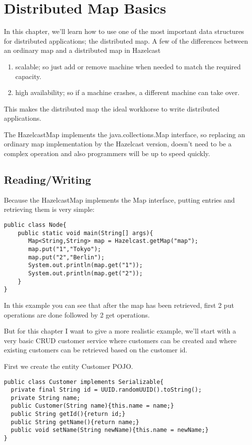 \chapter{Distributed Map Basics}

In this chapter, we'll learn how to use one of the most important data structures for distributed applications; the distributed map. A few of the differences between an ordinary map and a distributed map in Hazelcast
\begin{enumerate}
\item scalable; so just add or remove machine when needed to match the required capacity.
\item high availability; so if a machine crashes, a different machine can take over. 
\end{enumerate}
This makes the distributed map the ideal workhorse to write distributed applications.

The HazelcastMap implements the java.collections.Map interface, so replacing an ordinary map implementation by the Hazelcast version, doesn't need to be a complex operation and also programmers will be up to speed quickly.

\section{Reading/Writing}
Because the HazelcastMap implements the Map interface, putting entries and retrieving them is very simple:

\begin{verbatim}
public class Node{
    public static void main(String[] args){
       Map<String,String> map = Hazelcast.getMap("map");
       map.put("1","Tokyo");
       map.put("2","Berlin");
       System.out.println(map.get("1"));
       System.out.println(map.get("2"));
    }
}
\end{verbatim}
In this example you can see that after the map has been retrieved, first 2 put operations are done followed by 2 get operations. 

But for this chapter I want to give a more realistic example, we'll start with a  very basic CRUD customer service where customers can be created and where existing customers can be retrieved based on the customer id.

First we create the entity Customer POJO. 
\begin{verbatim}
public class Customer implements Serializable{
  private final String id = UUID.randomUUID().toString();
  private String name;
  public Customer(String name){this.name = name;}
  public String getId(){return id;}
  public String getName(){return name;}
  public void setName(String newName){this.name = newName;}
}
\end{verbatim}


